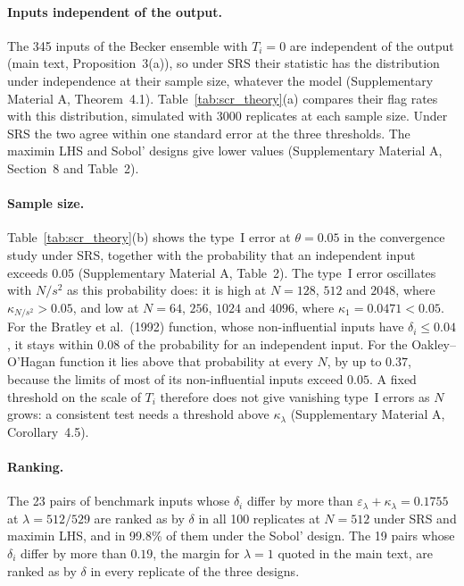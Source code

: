 \documentclass[11pt,a4paper]{article}
\begin{document}
\paragraph{Inputs independent of the output.} The 345 inputs of the Becker ensemble with $T_i=0$ are independent of the output (main text, Proposition~3(a)), so under SRS their statistic has the distribution under independence at their sample size, whatever the model (Supplementary Material A, Theorem~4.1). Table~\ref{tab:scr_theory}(a) compares their flag rates with this distribution, simulated with 3000 replicates at each sample size. Under SRS the two agree within one standard error at the three thresholds. The maximin LHS and Sobol' designs give lower values (Supplementary Material A, Section~8 and Table~2).

\paragraph{Sample size.} Table~\ref{tab:scr_theory}(b) shows the type~I error at $\theta=0.05$ in the convergence study under SRS, together with the probability that an independent input exceeds $0.05$ (Supplementary Material A, Table~2). The type~I error oscillates with $N/s^2$ as this probability does: it is high at $N=128$, $512$ and $2048$, where $\kappa_{N/s^2}>0.05$, and low at $N=64$, $256$, $1024$ and $4096$, where $\kappa_1=0.0471<0.05$. For the Bratley et al.\ (1992) function, whose non-influential inputs have $\delta_i\le0.04$, it stays within $0.08$ of the probability for an independent input. For the Oakley--O'Hagan function it lies above that probability at every $N$, by up to $0.37$, because the limits of most of its non-influential inputs exceed $0.05$. A fixed threshold on the scale of $T_i$ therefore does not give vanishing type~I errors as $N$ grows: a consistent test needs a threshold above $\kappa_\lambda$ (Supplementary Material A, Corollary~4.5).

\paragraph{Ranking.} The 23 pairs of benchmark inputs whose $\delta_i$ differ by more than $\varepsilon_\lambda+\kappa_\lambda=0.1755$ at $\lambda=512/529$ are ranked as by $\delta$ in all 100 replicates at $N=512$ under SRS and maximin LHS, and in 99.8\% of them under the Sobol' design. The 19 pairs whose $\delta_i$ differ by more than $0.19$, the margin for $\lambda=1$ quoted in the main text, are ranked as by $\delta$ in every replicate of the three designs.
\end{document}
